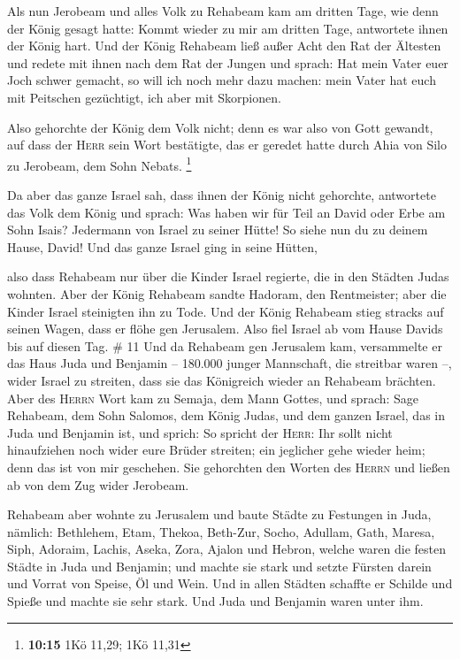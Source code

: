  Als nun Jerobeam und alles Volk zu Rehabeam kam am
dritten Tage, wie denn der König gesagt hatte: Kommt wieder zu mir am
dritten Tage,  antwortete ihnen der König hart. Und der
König Rehabeam ließ außer Acht den Rat der Ältesten  und
redete mit ihnen nach dem Rat der Jungen und sprach: Hat mein Vater euer
Joch schwer gemacht, so will ich noch mehr dazu machen: mein Vater hat
euch mit Peitschen gezüchtigt, ich aber mit Skorpionen.

 Also gehorchte der König dem Volk nicht; denn es war
also von Gott gewandt, auf dass der \textsc{Herr} sein Wort bestätigte,
das er geredet hatte durch Ahia von Silo zu Jerobeam, dem Sohn Nebats.
\footnote{\textbf{10:15} 1Kö 11,29; 1Kö 11,31}

 Da aber das ganze Israel sah, dass ihnen der König nicht
gehorchte, antwortete das Volk dem König und sprach: Was haben wir für
Teil an David oder Erbe am Sohn Isais? Jedermann von Israel zu seiner
Hütte! So siehe nun du zu deinem Hause, David! Und das ganze Israel ging
in seine Hütten,

 also dass Rehabeam nur über die Kinder Israel regierte,
die in den Städten Judas wohnten.  Aber der König
Rehabeam sandte Hadoram, den Rentmeister; aber die Kinder Israel
steinigten ihn zu Tode. Und der König Rehabeam stieg stracks auf seinen
Wagen, dass er flöhe gen Jerusalem.  Also fiel Israel ab
vom Hause Davids bis auf diesen Tag. \# 11  Und da
Rehabeam gen Jerusalem kam, versammelte er das Haus Juda und Benjamin --
180.000 junger Mannschaft, die streitbar waren --, wider Israel zu
streiten, dass sie das Königreich wieder an Rehabeam brächten.
 Aber des \textsc{Herrn} Wort kam zu Semaja, dem Mann
Gottes, und sprach:  Sage Rehabeam, dem Sohn Salomos, dem
König Judas, und dem ganzen Israel, das in Juda und Benjamin ist, und
sprich:  So spricht der \textsc{Herr}: Ihr sollt nicht
hinaufziehen noch wider eure Brüder streiten; ein jeglicher gehe wieder
heim; denn das ist von mir geschehen. Sie gehorchten den Worten des
\textsc{Herrn} und ließen ab von dem Zug wider Jerobeam.

 Rehabeam aber wohnte zu Jerusalem und baute Städte zu
Festungen in Juda,  nämlich: Bethlehem, Etam, Thekoa,
 Beth-Zur, Socho, Adullam,  Gath, Maresa,
Siph,  Adoraim, Lachis, Aseka,  Zora,
Ajalon und Hebron, welche waren die festen Städte in Juda und Benjamin;
 und machte sie stark und setzte Fürsten darein und
Vorrat von Speise, Öl und Wein.  Und in allen Städten
schaffte er Schilde und Spieße und machte sie sehr stark. Und Juda und
Benjamin waren unter ihm.

